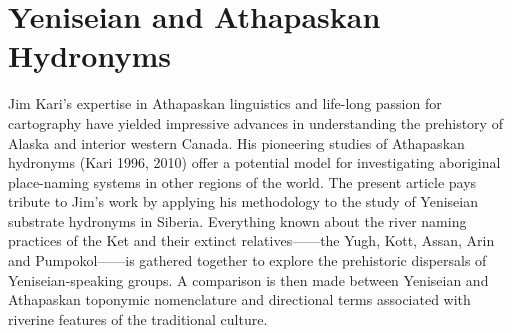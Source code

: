 \chapter[Yeniseian and Athapaskan Hydronyms]{\vspace{-25pt} Yeniseian and Athapaskan Hydronyms}


\def\authorlast{Vajda}

\renewcommand{\beginchapter}{\pageref{vajda-ch-begin}}
\renewcommand{\finishchapter}{\pageref{vajda-ch-end}}
\label{vajda-ch-begin}



\thispagestyle{firststyle}



Jim Kari’s expertise in Athapaskan linguistics and life-long passion for cartography have yielded impressive advances in understanding the prehistory of Alaska and interior western Canada. His pioneering studies of Athapaskan hydronyms (Kari 1996, 2010) offer a potential model for investigating aboriginal place-naming systems in other regions of the world. The present article pays tribute to Jim’s work by applying his methodology to the study of Yeniseian substrate hydronyms in Siberia. Everything known about the river naming practices of the Ket and their extinct relatives——the Yugh, Kott, Assan, Arin and Pumpokol——is gathered together to explore the prehistoric dispersals of Yeniseian-speaking groups. A comparison is then made between Yeniseian and Athapaskan toponymic nomenclature and directional terms associated with riverine features of the traditional culture.




